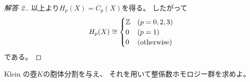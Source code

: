 \documentclass[report]{jlreq}
\begin{document}
\begin{proof}[解答 2.]
    以上より$H_p(X) = C_p(X)$を得る。
    したがって
    \begin{equation}
        H_p(X) \cong \begin{cases}
            \mathbb{Z} & (p = 0, 2, 3) \\
            0 & (p = 1) \\
            0 & (\text{otherwise})
        \end{cases}
    \end{equation}
    である。
\end{proof}

\begin{problem}
    Klein の壺$K$の胞体分割を与え、
    それを用いて整係数ホモロジー群を求めよ。
\end{problem}

\end{document}
